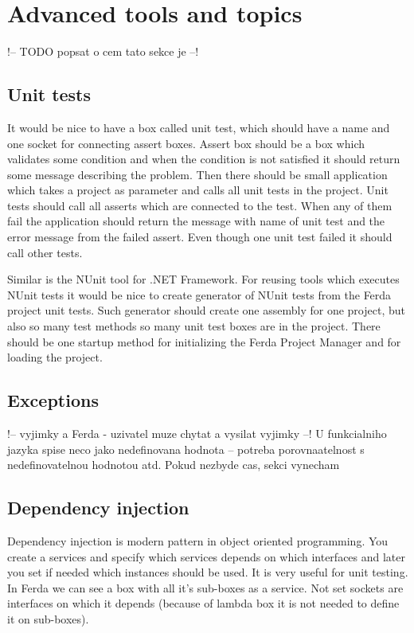 \documentclass[a4paper,12pt]{book}
\begin{document}
\section{Advanced tools and topics}
!-- TODO popsat o cem tato sekce je --!

\subsection{Unit tests}
It would be nice to have a box called unit test, which should have a name and one socket for connecting assert boxes. Assert box should be a box which validates some condition and when the condition is not satisfied it should return some message describing the problem. Then there should be small application which takes a project as parameter and calls all unit tests in the project. Unit tests should call all asserts which are connected to the test. When any of them fail the application should return the message with name of unit test and the error message from the failed assert. Even though one unit test failed it should call other tests.

Similar is the NUnit tool for .NET Framework. For reusing tools which executes NUnit tests it would be nice to create generator of NUnit tests from the Ferda project unit tests. Such generator should create one assembly for one project, but also so many test methods so many unit test boxes are in the project. There should be one startup method for initializing the Ferda Project Manager and for loading the project. 

\subsection{Exceptions}
!-- vyjimky a Ferda - uzivatel muze chytat a vysilat vyjimky --! U funkcialniho jazyka spise neco jako nedefinovana hodnota -- potreba porovnaatelnost s nedefinovatelnou hodnotou atd. Pokud nezbyde cas, sekci vynecham

\subsection{Dependency injection}
Dependency injection is modern pattern in object oriented programming. You create a services and specify which services depends on which interfaces and later you set if needed which instances should be used. It is very useful for unit testing. In Ferda we can see a box with all it's sub-boxes as a service. Not set sockets are interfaces on which it depends (because of lambda box it is not needed to define it on sub-boxes).
\end{document}
